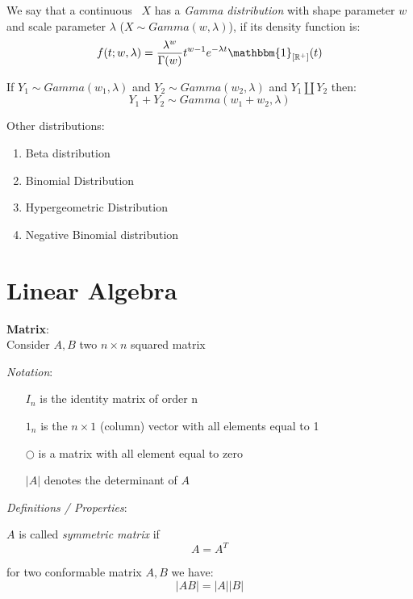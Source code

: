 \begin{defi}
	We say that a continuous \rv \  $X$ has a \textit{Gamma distribution} with shape parameter $w$ and scale parameter $\lambda$ ($X\sim Gamma(w,\lambda)$), if its density function is:
	$$f(t;w,\lambda)=\frac{\lambda^w}{\Gamma(w)}t^{w-1}e^{-\lambda t} \mathbbm{1}_{[\mathbb{R}^+]}(t)$$
\end{defi}

\begin{prop}
If $Y_1\sim Gamma(w_1,\lambda)$ and $Y_2\sim Gamma(w_2,\lambda)$ and $Y_1 \coprod Y_2$ then:
$$Y_1 + Y_2\sim Gamma(w_1+w_2,\lambda)$$
\end{prop}



Other distributions:
\begin{enumerate}
	\item Beta distribution
	\item Binomial Distribution
	\item Hypergeometric Distribution
	\item Negative Binomial distribution
\end{enumerate}


\section{Linear Algebra}
\textbf{Matrix}:\\
Consider $A,B$ two $n \times n$ squared matrix

\textit{Notation}:
\begin{enumerate}
	\item[$I_n$] is the identity matrix of order n
	\item[$1_n$] is the $n \times 1$ (column) vector with all elements equal to 1
	\item[$\bigcirc$] is a matrix with all element equal to zero
	\item[$|A|$] denotes the determinant of $A$
\end{enumerate}



\textit{Definitions / Properties}:

\begin{defi}
	$A$ is called \textit{symmetric matrix} if 
	$$A=A^T$$
\end{defi}


\begin{prop}
	for two conformable matrix $A,B$ we have:
	$$|AB|=|A||B|$$
\end{prop}


